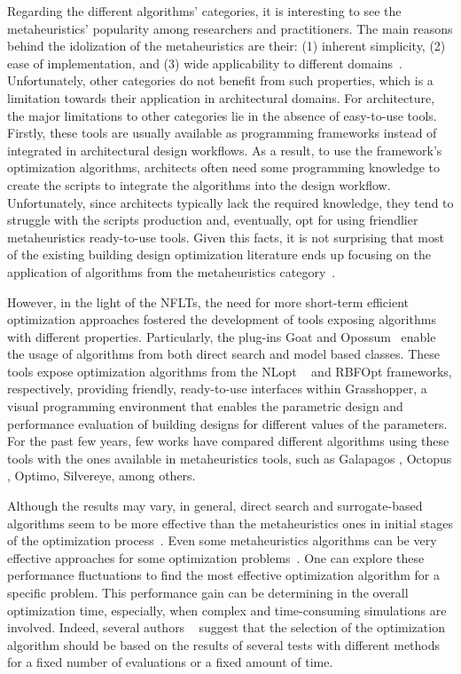 	Regarding the different algorithms' categories, it is interesting to see the metaheuristics' popularity among researchers and practitioners. The main reasons behind the idolization of the metaheuristics are their: (1) inherent simplicity, (2) ease of implementation, and (3) wide applicability to different domains~\cite{Wortmann2017ADO}. Unfortunately, other categories do not benefit from such properties, which is a limitation towards their application in architectural domains. For architecture, the major limitations to other categories lie in the absence of easy-to-use tools. Firstly, these tools are usually available as programming frameworks instead of integrated in architectural design workflows. As a result, to use the framework's optimization algorithms, architects often need some programming knowledge to create the scripts to integrate the algorithms into the design workflow. Unfortunately, since architects typically lack the required knowledge, they tend to struggle with the scripts production and, eventually, opt for using friendlier metaheuristics ready-to-use tools. Given this facts, it is not surprising that most of the existing building design optimization literature ends up focusing on the application of algorithms from the metaheuristics category~\cite{Hamdy2016, Nguyen2014, Evins2013}. 
		
	However, in the light of the \acp{NFLT}, the need for more short-term efficient optimization approaches fostered the development of tools exposing algorithms with different properties. Particularly, the plug-ins Goat and Opossum~\cite{Wortmann2017Opossum} enable the usage of algorithms from both direct search and model based classes. These tools expose optimization algorithms from the NLopt ~\cite{NLOPT} and RBFOpt frameworks, respectively, providing friendly, ready-to-use interfaces within Grasshopper, a visual programming environment that enables the parametric design and performance evaluation of building designs for different values of the parameters. For the past few years, few works have compared different algorithms using these tools with the ones available in metaheuristics tools, such as Galapagos , Octopus , Optimo, Silvereye, among others.
	
	Although the results may vary, in general, direct search and surrogate-based algorithms seem to be more effective than the metaheuristics ones in initial stages of the optimization process~\cite{Wortmann2017,Wortmann2016BBO,Wortmann2017GABESTCHOICE}. Even some metaheuristics algorithms can be very effective approaches for some optimization problems~\cite{Waibel2018}. 
One can explore these performance fluctuations to find the most effective optimization algorithm for a specific problem. This performance gain can be determining in the overall optimization time, especially, when complex and time-consuming simulations are involved. Indeed, several authors ~\cite{Wortmann2016BBO,Hamdy2016} suggest that the selection of the optimization algorithm should be based on the results of several tests with different methods for a fixed number of evaluations or a fixed amount of time. 

